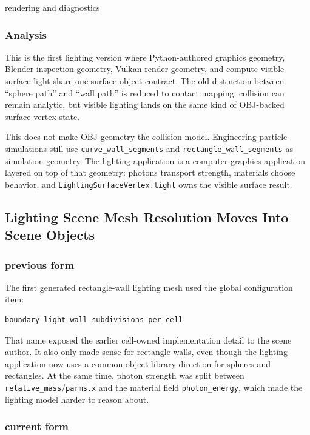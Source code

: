 rendering and diagnostics

\subsubsection{Analysis}

This is the first lighting version where Python-authored graphics geometry,
Blender inspection geometry, Vulkan render geometry, and compute-visible
surface light share one surface-object contract.  The old distinction between
``sphere path'' and ``wall path'' is reduced to contact mapping: collision can
remain analytic, but visible lighting lands on the same kind of OBJ-backed
surface vertex state.

This does not make OBJ geometry the collision model.  Engineering particle
simulations still use \texttt{curve\_wall\_segments} and
\texttt{rectangle\_wall\_segments} as simulation geometry.  The lighting
application is a computer-graphics application layered on top of that
geometry: photons transport strength, materials choose behavior, and
\texttt{LightingSurfaceVertex.light} owns the visible surface result.

\subsection{Lighting Scene Mesh Resolution Moves Into Scene Objects}

\subsubsection{previous form}

The first generated rectangle-wall lighting mesh used the global configuration
item:
\begin{verbatim}
boundary_light_wall_subdivisions_per_cell
\end{verbatim}
That name exposed the earlier cell-owned implementation detail to the scene
author.  It also only made sense for rectangle walls, even though the lighting
application now uses a common object-library direction for spheres and
rectangles.  At the same time, photon strength was split between
\texttt{relative\_mass}/\texttt{parms.x} and the material field
\texttt{photon\_energy}, which made the lighting model harder to reason about.

\subsubsection{current form}

